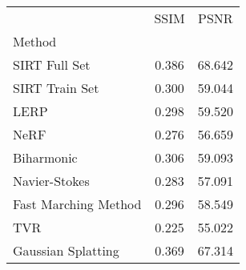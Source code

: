 \begin{tabular}{|l|c|c|}
\toprule
 & SSIM & PSNR \\
Method &  &  \\
\midrule
SIRT Full Set & 0.386 & 68.642 \\
SIRT Train Set & \cellcolor{rankthird}0.300 & 59.044 \\
LERP & 0.298 & \cellcolor{ranksecond}59.520 \\
NeRF & 0.276 & 56.659 \\
Biharmonic & \cellcolor{ranksecond}0.306 & \cellcolor{rankthird}59.093 \\
Navier-Stokes & 0.283 & 57.091 \\
Fast Marching Method & 0.296 & 58.549 \\
TVR & \cellcolor{rankworst}0.225 & \cellcolor{rankworst}55.022 \\
Gaussian Splatting & \cellcolor{rankfirst}0.369 & \cellcolor{rankfirst}67.314 \\
\bottomrule
\end{tabular}
